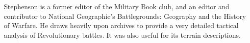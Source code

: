 Stephenson is a former editor of the Military Book club, and an editor and
contributor to National Geographic's Battlegrounds: Geography and the History of
Warfare. He draws heavily upon archives to provide a very detailed tactical
analysis of Revolutionary battles. It was also useful for its terrain
descriptions.
%
%
%
%
%
